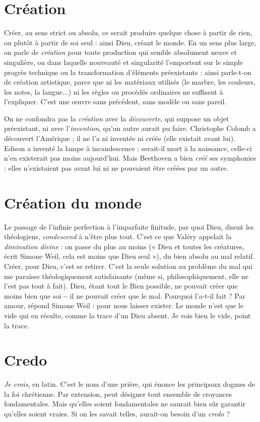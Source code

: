 \section{Création}
Créer, au sens strict ou absolu, ce serait produire quelque chose
à partir de rien, ou plutôt à partir de soi seul : ainsi Dieu,
créant le monde. En un sens plus large, on parle de {\it création} pour toute production
qui semble absolument neuve et singulière, ou dans laquelle nouveauté et
singularité l’emportent sur le simple progrès technique ou la transformation
d'éléments préexistants : ainsi parle-t-on de création artistique, parce que ni les
matériaux utilisés (le marbre, les couleurs, les notes, la langue...) ni les règles
ou procédés ordinaires ne suffisent à l’expliquer. C’est une œuvre sans précédent,
sans modèle ou sans pareil.

On ne confondra pas la {\it création} avec la {\it découverte}, qui suppose un objet
préexistant, ni avec l'{\it invention}, qu’un autre aurait pu faire. Christophe Colomb a
découvert l'Amérique ; il ne l’a ni inventée ni créée (elle existait avant lui). Edison
a inventé la lampe à incandescence : serait-il mort à la naissance, celle-ci n’en existerait
pas moins aujourd’hui. Mais Beethoven a bien {\it créé} ses symphonies : elles
n’existaient pas avant lui ni ne pouvaient être créées par un autre.

\section{Création du monde}
Le passage de l’infinie perfection à l’imparfaite
finitude, par quoi Dieu, disent les théologiens,
{\it condescend} à n'être plus tout. C’est ce que Valéry appelait la {\it diminution divine} :
on passe du plus au moins (« Dieu et toutes les créatures, écrit Simone Weil,
cela est moins que Dieu seul »), du bien absolu au mal relatif. Créer, pour
Dieu, c’est se retirer. C’est la seule solution au problème du mal qui me
paraisse théologiquement satisfaisante (même si, philosophiquement, elle ne
l’est pas tout à fait). Dieu, étant tout le Bien possible, ne pouvait créer que
moins bien que soi {\bf --} il ne pouvait créer que le mal. Pourquoi l’a-t-il fait ? Par
amour, répond Simone Weil : pour nous laisser exister. Le monde n’est que le
vide qui en résulte, comme la trace d’un Dieu absent.
Je vois bien le vide, point la trace.

\section{Credo}
{\it Je crois}, en latin. C’est le nom d’une prière, qui énonce les principaux
dogmes de la foi chrétienne. Par extension, peut désigner tout
ensemble de croyances fondamentales. Mais qu’elles soient fondamentales ne
saurait bien sûr garantir qu’elles soient vraies. Si on les savait telles, aurait-on
besoin d’un {\it credo} ?

